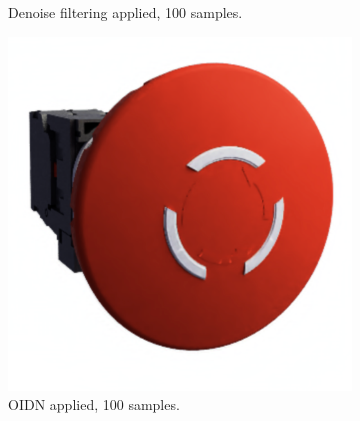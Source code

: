 \begin{figure}[H]
\begin{subfigure}[t]{0.4\textwidth}
        \caption{Denoise filtering applied, 100 samples.}
        \label{fig:denoise-gaussian-100-samples}
    \end{subfigure}
    \hspace*{0.8cm}
    \vfill
    \vspace*{0.5cm}
    \hspace*{0.8cm}
    \begin{subfigure}[t]{0.4\textwidth}
        \includegraphics[width=\textwidth]{resources/denoise-oidn-100-samples.png}
        \caption{\gls{OIDN} applied, 100 samples.}
        \label{fig:denoise-oidn-100-samples}
    \end{subfigure}
    \hfill
    \begin{subfigure}[t]{0.4\textwidth}

\end{subfigure}
\end{figure}

